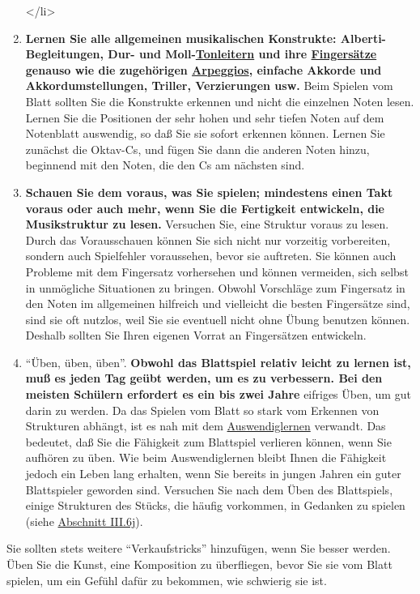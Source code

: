 \begin{enumerate}[label={\arabic*.}]
</li>
\item \textbf{Lernen Sie alle allgemeinen musikalischen Konstrukte: Alberti-Begleitungen, Dur- und Moll-\hyperref[c1iii5]{Tonleitern} und ihre \hyperref[table]{Fingersätze} genauso wie die zugehörigen \hyperref[Arpeggios]{Arpeggios}, einfache Akkorde und Akkordumstellungen, Triller, Verzierungen usw.}
Beim Spielen vom Blatt sollten Sie die Konstrukte erkennen und nicht die einzelnen Noten lesen.
Lernen Sie die Positionen der sehr hohen und sehr tiefen Noten auf dem Notenblatt auswendig, so daß Sie sie sofort erkennen können.
Lernen Sie zunächst die Oktav-Cs, und fügen Sie dann die anderen Noten hinzu, beginnend mit den Noten, die den Cs am nächsten sind.


\item \textbf{Schauen Sie dem voraus, was Sie spielen; mindestens einen Takt voraus oder auch mehr, wenn Sie die Fertigkeit entwickeln, die Musikstruktur zu lesen.}
Versuchen Sie, eine Struktur voraus zu lesen.
Durch das Vorausschauen können Sie sich nicht nur vorzeitig vorbereiten, sondern auch Spielfehler voraussehen, bevor sie auftreten.
Sie können auch Probleme mit dem Fingersatz vorhersehen und können vermeiden, sich selbst in unmögliche Situationen zu bringen.
Obwohl Vorschläge zum Fingersatz in den Noten im allgemeinen hilfreich und vielleicht die besten Fingersätze sind, sind sie oft nutzlos, weil Sie sie eventuell nicht ohne Übung benutzen können.
Deshalb sollten Sie Ihren eigenen Vorrat an Fingersätzen entwickeln.


\item \enquote{Üben, üben, üben}.
\textbf{Obwohl das Blattspiel relativ leicht zu lernen ist, muß es jeden Tag geübt werden, um es zu verbessern.
Bei den meisten Schülern erfordert es ein bis zwei Jahre} eifriges Üben, um gut darin zu werden.
Da das Spielen vom Blatt so stark vom Erkennen von Strukturen abhängt, ist es nah mit dem \hyperref[c1iii6]{Auswendiglernen} verwandt.
Das bedeutet, daß Sie die Fähigkeit zum Blattspiel verlieren können, wenn Sie aufhören zu üben.
Wie beim Auswendiglernen bleibt Ihnen die Fähigkeit jedoch ein Leben lang erhalten, wenn Sie bereits in jungen Jahren ein guter Blattspieler geworden sind.
Versuchen Sie nach dem Üben des Blattspiels, einige Strukturen des Stücks, die häufig vorkommen, in Gedanken zu spielen (siehe \hyperref[c1iii6j]{Abschnitt III.6j}).


\end{enumerate}
Sie sollten stets weitere \enquote{Verkaufstricks} hinzufügen, wenn Sie besser werden.
Üben Sie die Kunst, eine Komposition zu überfliegen, bevor Sie sie vom Blatt spielen, um ein Gefühl dafür zu bekommen, wie schwierig sie ist.
